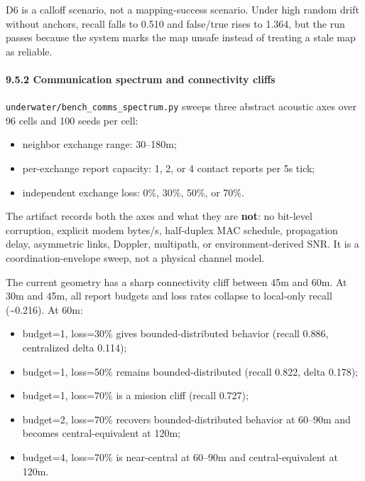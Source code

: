 D6 is a calloff scenario, not a mapping-success scenario. Under high
random drift without anchors, recall falls to 0.510 and false/true rises
to 1.364, but the run passes because the system marks the map unsafe
instead of treating a stale map as reliable.

\paragraph{9.5.2 Communication spectrum and connectivity
cliffs}\label{communication-spectrum-and-connectivity-cliffs}

\texttt{underwater/bench\_comms\_spectrum.py} sweeps three abstract
acoustic axes over 96 cells and 100 seeds per cell:

\begin{itemize}
\tightlist
\item
  neighbor exchange range: 30--180m;
\item
  per-exchange report capacity: 1, 2, or 4 contact reports per 5s tick;
\item
  independent exchange loss: 0\%, 30\%, 50\%, or 70\%.
\end{itemize}

The artifact records both the axes and what they are \textbf{not}: no
bit-level corruption, explicit modem bytes/s, half-duplex MAC schedule,
propagation delay, asymmetric links, Doppler, multipath, or
environment-derived SNR. It is a coordination-envelope sweep, not a
physical channel model.

The current geometry has a sharp connectivity cliff between 45m and 60m.
At 30m and 45m, all report budgets and loss rates collapse to local-only
recall (\textasciitilde0.216). At 60m:

\begin{itemize}
\tightlist
\item
  budget=1, loss=30\% gives bounded-distributed behavior (recall 0.886,
  centralized delta 0.114);
\item
  budget=1, loss=50\% remains bounded-distributed (recall 0.822, delta
  0.178);
\item
  budget=1, loss=70\% is a mission cliff (recall 0.727);
\item
  budget=2, loss=70\% recovers bounded-distributed behavior at 60--90m
  and becomes central-equivalent at 120m;
\item
  budget=4, loss=70\% is near-central at 60--90m and central-equivalent
  at 120m.
\end{itemize}

